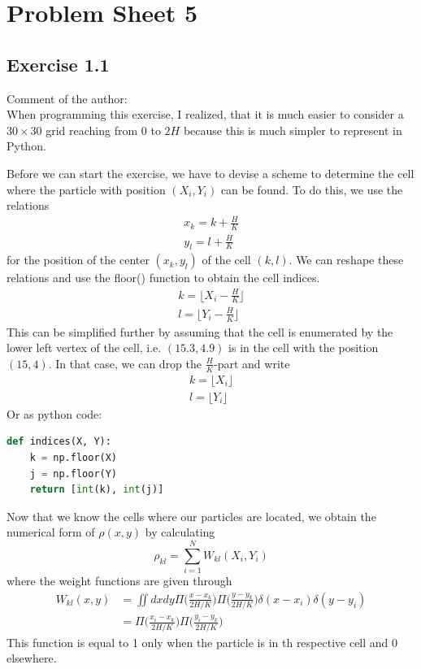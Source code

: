 \documentclass{scrartcl}
\begin{document}
\section*{Problem Sheet 5}
\subsection*{Exercise 1.1}

Comment of the author:\\
When programming this exercise, I realized, that it is much easier to consider a \( 30 \times 30 \) grid reaching from 0 to \(2H\) because this is much simpler to represent in Python.

Before we can start the exercise, we have to devise a scheme to determine the cell where the particle with position \( (X_i, Y_i) \) can be found. To do this, we use the relations
\begin{align}
	x_k = k + \frac{H}{K} \\
	y_l = l + \frac{H}{K} 
\end{align}
for the position of the center \( (x_k, y_l) \) of the cell \( (k,l) \). We can reshape these relations and use the floor() function to obtain the cell indices.
\begin{align}
	k = \Big \lfloor X_i - \frac{H}{K} \Big \rfloor \\
	l = \Big \lfloor Y_i - \frac{H}{K} \Big \rfloor
\end{align}
This can be simplified further by assuming that the cell is enumerated by the lower left vertex of the cell, i.e. \( (15.3, 4.9) \) is in the cell with the position \( (15, 4) \). In that case, we can drop the \( \frac{H}{K} \)-part and write
\begin{align}
k = \Big \lfloor X_i \Big \rfloor \\
l = \Big \lfloor Y_i \Big \rfloor
\end{align}
Or as python code:
\begin{lstlisting}[title=Function to calculate the index., language=Python, frame=single]
def indices(X, Y):
	k = np.floor(X)
	j = np.floor(Y)
	return [int(k), int(j)]
\end{lstlisting}
Now that we know the cells where our particles are located, we obtain the numerical form of \( \rho(x,y) \) by calculating
\begin{equation}
	\rho_{kl} = \sum_{i=1}^N W_{kl}(X_i, Y_i)
\end{equation}
where the weight functions are given through
\begin{align}\label{weights}
	W_{kl}(x,y) & = \iint dx dy \Pi\Big(\frac{x-x_k}{2H/K}\Big)\Pi\Big(\frac{y-y_k}{2H/K}\Big)
					\delta(x-x_i)\delta(y-y_i)\\
				& = \Pi\Big(\frac{x_i-x_k}{2H/K}\Big)\Pi\Big(\frac{y_i-y_k}{2H/K}\Big)
\end{align}
This function is equal to 1 only when the particle is in th respective cell and 0 elsewhere.
\end{document}
